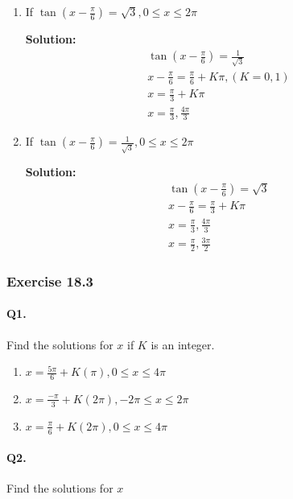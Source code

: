 \documentclass{article}
\begin{document}
\begin{enumerate}[label=\alph*)]
  \item If $\tan \left(x - \frac{\pi}{6} \right) = \sqrt{3}, 0 \leq x \leq 2\pi$

        {\scriptsize \textbf{Solution:}}
        \[
        \begin{aligned}
          \tan \left(x - \frac{\pi}{6} \right) = \frac{1}{\sqrt{3}} \\
          x - \frac{\pi}{6} = \frac{\pi}{6} + K\pi, (K = 0, 1) \\
          x = \frac{\pi}{3} + K\pi \\
          x = \frac{\pi}{3}, \frac{4\pi}{3}
        \end{aligned}
        \]

  \item If $\tan \left(x - \frac{\pi}{6} \right) = \frac{1}{\sqrt{3}}, 0 \leq x \leq 2\pi$

        {\scriptsize \textbf{Solution:}}
        \[
        \begin{aligned}
          \tan \left(x - \frac{\pi}{6} \right) = \sqrt{3} \\
          x - \frac{\pi}{6} = \frac{\pi}{3} + K\pi \\
          x = \frac{\pi}{3}, \frac{4\pi}{3} \\
          x = \frac{\pi}{2}, \frac{3\pi}{2}
        \end{aligned}
        \]
\end{enumerate}

\subsubsection {Exercise 18.3}
\paragraph{Q1.}
Find the solutions for $x$ if $K$ is an integer.

\begin{enumerate}[label=\alph*)]
  \item $x=\frac{5\pi}{6} + K(\pi), 0 \leq x \leq 4\pi$
  \item $x=\frac{-\pi}{3} + K(2\pi), -2\pi \leq x \leq 2\pi$
  \item $x=\frac{\pi}{6} + K(2\pi), 0 \leq x \leq 4\pi$
\end{enumerate}

\paragraph{Q2.}
Find the solutions for $x$
\end{document}
